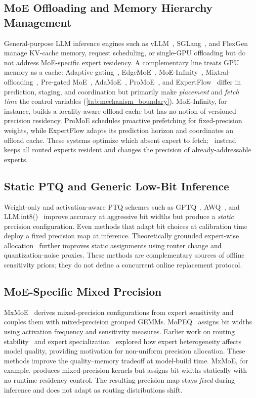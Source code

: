 \subsection{MoE Offloading and Memory Hierarchy Management}
General-purpose LLM inference engines such as vLLM~\cite{kwon2023vllm}, SGLang~\cite{zheng2024sglang}, and FlexGen~\cite{sheng2023flexgen} manage KV-cache memory, request scheduling, or single-GPU offloading but do not address MoE-specific expert residency.
A complementary line treats GPU memory as a cache: Adaptive gating~\cite{li2023adaptive}, EdgeMoE~\cite{yi2023edgemoe}, MoE-Infinity~\cite{xue2024moe}, Mixtral-offloading~\cite{eliseev2023fast}, Pre-gated MoE~\cite{hwang2024pre}, AdaMoE~\cite{zhong2024adapmoe}, ProMoE~\cite{song2024promoe}, and ExpertFlow~\cite{shen2025expertflow} differ in prediction, staging, and coordination but primarily make \emph{placement} and \emph{fetch time} the control variables (\autoref{tab:mechanism_boundary}). MoE-Infinity, for instance, builds a locality-aware offload cache but has no notion of versioned precision residency. ProMoE schedules proactive prefetching for fixed-precision weights, while ExpertFlow adapts its prediction horizon and coordinates an offload cache. These systems optimize which absent expert to fetch; \systemname\ instead keeps all routed experts resident and changes the precision of already-addressable experts.

\subsection{Static PTQ and Generic Low-Bit Inference}
Weight-only and activation-aware PTQ schemes such as GPTQ~\cite{frantar2022gptq}, AWQ~\cite{lin2024awq}, and LLM.int8()~\cite{dettmers2022gptint8} improve accuracy at aggressive bit widths but produce a \emph{static} precision configuration. Even methods that adapt bit choices at calibration time deploy a fixed precision map at inference. Theoretically grounded expert-wise allocation~\cite{chowdhury2026efficient} further improves static assignments using router change and quantization-noise proxies. These methods are complementary sources of offline sensitivity priors; they do not define a concurrent online replacement protocol.

\subsection{MoE-Specific Mixed Precision}
MxMoE~\cite{duanmu2025mxmoe} derives mixed-precision configurations from expert sensitivity and couples them with mixed-precision grouped GEMMs. MoPEQ~\cite{chitty2025mopeq} assigns bit widths using activation frequency and sensitivity measures. Earlier work on routing stability~\cite{fedus2022switch} and expert specialization~\cite{dai2024deepseekmoe} explored how expert heterogeneity affects model quality, providing motivation for non-uniform precision allocation. These methods improve the quality--memory tradeoff at model-build time. MxMoE, for example, produces mixed-precision kernels but assigns bit widths statically with no runtime residency control. The resulting precision map stays \emph{fixed} during inference and does not adapt as routing distributions shift.

